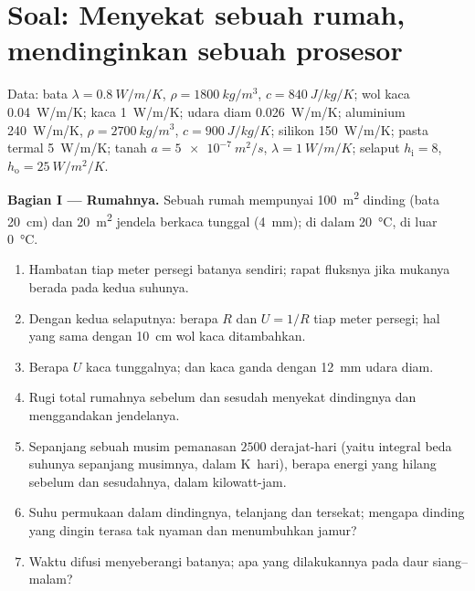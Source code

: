 \section{Soal: Menyekat sebuah rumah, mendinginkan sebuah prosesor}

\begin{problem}\label{pb:b2:heat-conduction:1}
Data: bata $\lambda = \qty{0.8}{W/m/K}$, $\rho = \qty{1800}{kg/m^3}$, $c =
\qty{840}{J/kg/K}$; wol kaca \qty{0.04}{W/m/K}; kaca \qty{1}{W/m/K}; udara
diam \qty{0.026}{W/m/K}; aluminium \qty{240}{W/m/K}, $\rho = \qty{2700}{kg/m^3}$,
$c = \qty{900}{J/kg/K}$; silikon \qty{150}{W/m/K}; pasta termal
\qty{5}{W/m/K}; tanah $a = \qty{5e-7}{m^2/s}$, $\lambda = \qty{1}{W/m/K}$;
selaput $h_{\text{i}} = 8$, $h_{\text{o}} = \qty{25}{W/m^2/K}$.

\textbf{Bagian I --- Rumahnya.}
Sebuah rumah mempunyai \qty{100}{m^2} dinding (bata \qty{20}{cm}) dan \qty{20}{m^2}
jendela berkaca tunggal (\qty{4}{mm}); di dalam \qty{20}{\celsius},
di luar \qty{0}{\celsius}.
\begin{enumerate}
  \item Hambatan tiap meter persegi batanya sendiri; rapat fluksnya
        jika mukanya berada pada kedua suhunya.
  \item Dengan kedua selaputnya: berapa $R$ dan $U = 1/R$ tiap meter persegi; hal yang sama
        dengan \qty{10}{cm} wol kaca ditambahkan.
  \item Berapa $U$ kaca tunggalnya; dan kaca ganda dengan \qty{12}{mm}
        udara diam.
  \item Rugi total rumahnya sebelum dan sesudah menyekat dindingnya
        dan menggandakan jendelanya.
  \item Sepanjang sebuah musim pemanasan $2500$ derajat-hari (yaitu integral
        beda suhunya sepanjang musimnya, dalam \unit{K.hari}),
        berapa energi yang hilang sebelum dan sesudahnya, dalam kilowatt-jam.
  \item Suhu permukaan dalam dindingnya, telanjang dan tersekat;
        mengapa dinding yang dingin terasa tak nyaman dan menumbuhkan jamur?
  \item Waktu difusi menyeberangi batanya; apa yang dilakukannya pada
        daur siang--malam?
\end{enumerate}


\end{problem}
